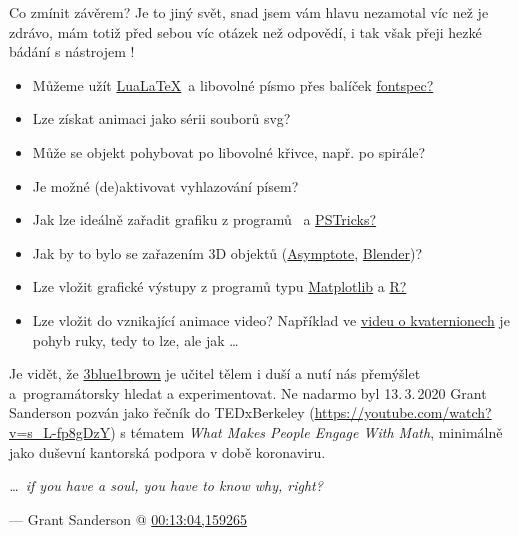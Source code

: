 Co zmínit závěrem? Je to jiný svět, snad jsem vám hlavu nezamotal víc než je zdrávo, mám totiž před sebou víc otázek než odpovědí, i tak však přeji hezké bádání s nástrojem \Manim!
\begin{itemize}
\itemsep=-2pt
\item Můžeme užít \href{http://luatex.org/}{Lua\LaTeX}\ a libovolné písmo přes balíček \href{https://ctan.org/pkg/fontspec}{\textsf{fontspec}?}
\item Lze získat animaci jako sérii souborů svg?
\item Může se objekt pohybovat po libovolné křivce, např. po spirále?
\item Je možné (de)aktivovat vyhlazování písem?
\item Jak lze ideálně zařadit grafiku z programů \href{https://ctan.org/pkg/metapost}{\MP}\ a \href{https://tug.org/PSTricks/main.cgi/}{PSTricks?}
\item Jak by to bylo se zařazením 3D objektů (\href{https://asymptote.sourceforge.io/}{Asymptote}, \href{https://www.blender.org/}{Blender})?
\item Lze vložit grafické výstupy z programů typu \href{https://matplotlib.org/}{Matplotlib} a \href{https://www.r-project.org/}{R?}
\item Lze vložit do vznikající animace video? Například ve \href{https://www.youtube.com/watch?v=d4EgbgTm0Bg&feature=youtu.be&t=1467}{videu o kvaternionech} je pohyb ruky, tedy to lze, ale jak \ldots{} 
\end{itemize}

Je vidět, že 
\href{https://www.youtube.com/channel/UCYO_jab_esuFRV4b17AJtAw}{3blue1brown} 
je učitel tělem i duší a nutí nás přemýšlet a~programátorsky hledat a experimentovat. Ne nadarmo byl 13.\,3.\,2020 Grant Sanderson pozván jako řečník do TEDxBerkeley (\url{https://youtube.com/watch?v=s_L-fp8gDzY}) s tématem \textit{What Makes People Engage With Math}, minimálně jako duševní kantorská podpora v době koronaviru.%
\medskip

\hfill \emph{\ldots\ if you have a soul, you have to know why, right?}\par
\hfill --- Grant Sanderson @ \href{https://www.youtube.com/watch?v=s_L-fp8gDzY&feature=youtu.be&t=784}{00:13:04,159265}%

